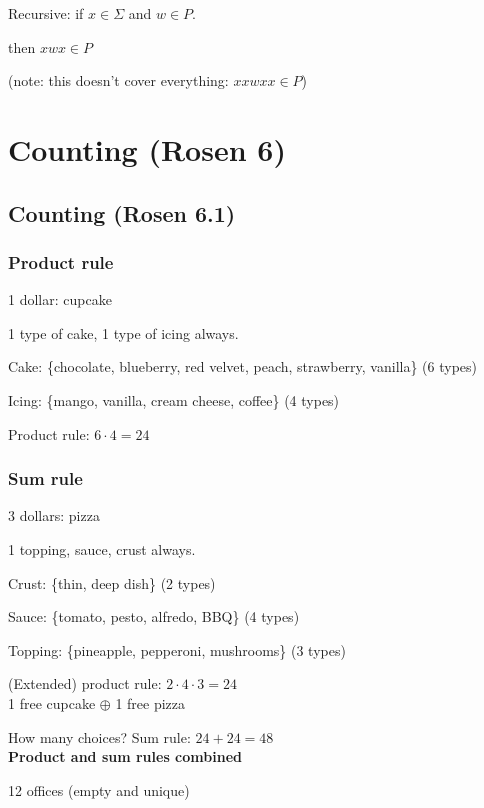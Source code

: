 \documentclass[english,openany]{book}
\begin{document}
    Recursive: if $x \in \Sigma$ and $w \in P$.

    then $xwx \in P$

    (note: this doesn't cover everything: $xxwxx \in P$)\\


	\chapter{Counting (Rosen 6)}

    \section{Counting (Rosen 6.1)}

    \subsection{Product rule}

    1 dollar: cupcake

    1 type of cake, 1 type of icing always.

    Cake: \{chocolate, blueberry, red velvet, peach, strawberry, vanilla\} (6 types)

    Icing: \{mango, vanilla, cream cheese, coffee\} (4 types)

    Product rule: $6 \cdot 4 = 24$\\

    \subsection{Sum rule}

    3 dollars: pizza

    1 topping, sauce, crust always.

    Crust: \{thin, deep dish\} (2 types)

    Sauce: \{tomato, pesto, alfredo, BBQ\} (4 types)

    Topping: \{pineapple, pepperoni, mushrooms\} (3 types)

    (Extended) product rule: $2 \cdot 4 \cdot 3 = 24$\\

    1 free cupcake $\oplus$ 1 free pizza

    How many choices? Sum rule: $24 + 24 = 48$\\

    \textbf{Product and sum rules combined}

    12 offices (empty and unique)
\end{document}
